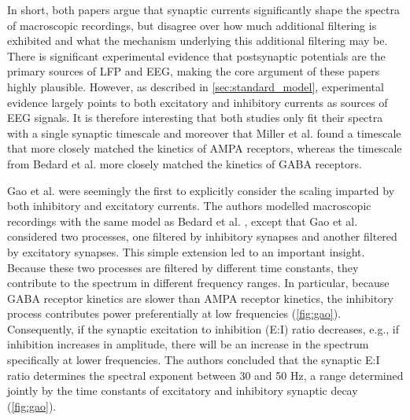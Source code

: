 In short, both papers argue that synaptic currents significantly shape the spectra of macroscopic recordings, but disagree over how much additional filtering is exhibited and what the mechanism underlying this additional filtering may be. There is significant experimental evidence that postsynaptic potentials are the primary sources of LFP and EEG, making the core argument of these papers highly plausible. However, as described in \autoref{sec:standard_model}, experimental evidence largely points to both excitatory and inhibitory currents as sources of EEG signals. It is therefore interesting that both studies only fit their spectra with a single synaptic timescale and moreover that Miller et al. \cite{Miller2009} found a timescale that more closely matched the kinetics of AMPA receptors, whereas the timescale from Bedard et al. \cite{Bedard2006} more closely matched the kinetics of GABA receptors.

Gao et al. \cite{Gao2017} were seemingly the first to explicitly consider the scaling imparted by both inhibitory and excitatory currents. The authors modelled macroscopic recordings with the same model as Bedard et al. \cite{Bedard2006}, except that Gao et al. considered two processes, one filtered by inhibitory synapses and another filtered by excitatory synapses. This simple extension led to an important insight. Because these two processes are filtered by different time constants, they contribute to the spectrum in different frequency ranges. In particular, because GABA receptor kinetics are slower than AMPA receptor kinetics, the inhibitory process contributes power preferentially at low frequencies (\autoref{fig:gao}). Consequently, if the synaptic excitation to inhibition (E:I) ratio decreases, e.g., if inhibition increases in amplitude, there will be an increase in the spectrum specifically at lower frequencies. The authors concluded that the synaptic E:I ratio determines the spectral exponent between 30 and 50 Hz, a range determined jointly by the time constants of excitatory and inhibitory synaptic decay (\autoref{fig:gao}).

